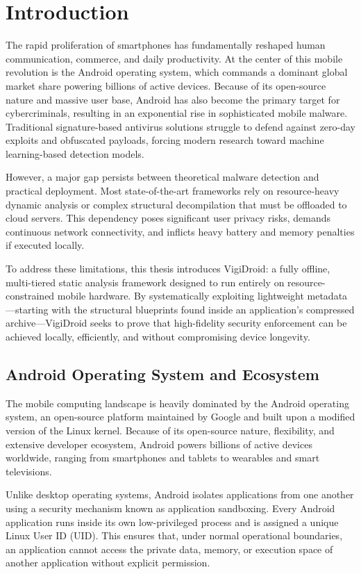 \chapter{Introduction}\label{intro}
The rapid proliferation of smartphones has fundamentally reshaped human communication, commerce, and daily productivity. At the center of this mobile revolution is the Android operating system, which commands a dominant global market share powering billions of active devices. Because of its open-source nature and massive user base, Android has also become the primary target for cybercriminals, resulting in an exponential rise in sophisticated mobile malware. Traditional signature-based antivirus solutions struggle to defend against zero-day exploits and obfuscated payloads, forcing modern research toward machine learning-based detection models.

However, a major gap persists between theoretical malware detection and practical deployment. Most state-of-the-art frameworks rely on resource-heavy dynamic analysis or complex structural decompilation that must be offloaded to cloud servers. This dependency poses significant user privacy risks, demands continuous network connectivity, and inflicts heavy battery and memory penalties if executed locally.

To address these limitations, this thesis introduces VigiDroid: a fully offline, multi-tiered static analysis framework designed to run entirely on resource-constrained mobile hardware. By systematically exploiting lightweight metadata—starting with the structural blueprints found inside an application's compressed archive—VigiDroid seeks to prove that high-fidelity security enforcement can be achieved locally, efficiently, and without compromising device longevity.

\section{ Android Operating System and Ecosystem}
The mobile computing landscape is heavily dominated by the Android operating system, an open-source platform maintained by Google and built upon a modified version of the Linux kernel. Because of its open-source nature, flexibility, and extensive developer ecosystem, Android powers billions of active devices worldwide, ranging from smartphones and tablets to wearables and smart televisions.

Unlike desktop operating systems, Android isolates applications from one another using a security mechanism known as application sandboxing. Every Android application runs inside its own low-privileged process and is assigned a unique Linux User ID (UID). This ensures that, under normal operational boundaries, an application cannot access the private data, memory, or execution space of another application without explicit permission.

